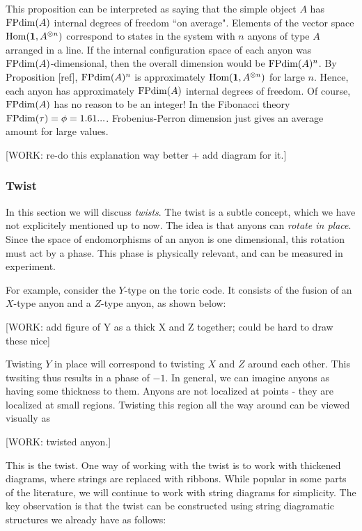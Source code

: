This proposition can be interpreted as saying that the simple object $A$ has $\operatorname{FPdim}(A)$ internal degrees of freedom ``on average". Elements of the vector space $\operatorname{Hom}(\mathbf{1},A^{\otimes n})$ correspond to states in the system with $n$ anyons of type $A$ arranged in a line. If the internal configuration space of each anyon was $\operatorname{FPdim}(A)$-dimensional, then the overall dimension would be $\operatorname{FPdim}(A)^n$. By Proposition [ref], $\operatorname{FPdim}(A)^n$ is approximately $\operatorname{Hom}(\mathbf{1},A^{\otimes n})$ for large $n$. Hence, each anyon has approximately $\operatorname{FPdim}(A)$ internal degrees of freedom. Of course, $\operatorname{FPdim}(A)$ has no reason to be an integer! In the Fibonacci theory $\operatorname{FPdim}(\tau)=\phi=1.61...$. Frobenius-Perron dimension just gives an average amount for large values.

[WORK: re-do this explanation way better + add diagram for it.]

\subsubsection{Twist}

In this section we will discuss \textit{twists}. The twist is a subtle concept, which we have not explicitely mentioned up to now. The idea is that anyons can \textit{rotate in place}. Since the space of endomorphisms of an anyon is one dimensional, this rotation must act by a phase. This phase is physically relevant, and can be measured in experiment.

For example, consider the $Y$-type on the toric code. It consists of the fusion of an $X$-type anyon and a $Z$-type anyon, as shown below:

[WORK: add figure of Y as a thick X and Z together; could be hard to draw these nice]

Twisting $Y$ in place will correspond to twisting $X$ and $Z$ around each other. This twsiting thus results in a phase of $-1$. In general, we can imagine anyons as having some thickness to them. Anyons are not localized at points - they are localized at small regions. Twisting this region all the way around can be viewed visually as

[WORK: twisted anyon.]

This is the twist. One way of working with the twist is to work with thickened diagrams, where strings are replaced with ribbons. While popular in some parts of the literature, we will continue to work with string diagrams for simplicity. The key observation is that the twist can be constructed using string diagramatic structures we already have as follows:

